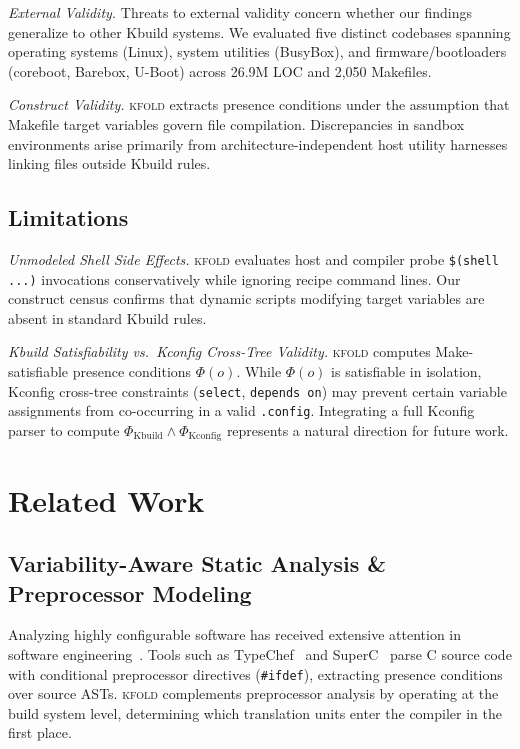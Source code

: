\documentclass[acmsmall,screen,review]{acmart}
\newcommand{\tool}{\textsc{kfold}\xspace}
\begin{document}
\emph{External Validity.} Threats to external validity concern whether our findings generalize to other Kbuild systems. We evaluated five distinct codebases spanning operating systems (Linux), system utilities (BusyBox), and firmware/bootloaders (coreboot, Barebox, U-Boot) across 26.9M LOC and 2,050 Makefiles.

\emph{Construct Validity.} \tool extracts presence conditions under the assumption that Makefile target variables govern file compilation. Discrepancies in sandbox environments arise primarily from architecture-independent host utility harnesses linking files outside Kbuild rules.

\subsection{Limitations}
\label{sec:threats:limitations}

\emph{Unmodeled Shell Side Effects.} \tool evaluates host and compiler probe \texttt{\$(shell ...)} invocations conservatively while ignoring recipe command lines. Our construct census confirms that dynamic scripts modifying target variables are absent in standard Kbuild rules.

\emph{Kbuild Satisfiability vs.\ Kconfig Cross-Tree Validity.} \tool computes Make-satisfiable presence conditions $\Phi(o)$. While $\Phi(o)$ is satisfiable in isolation, Kconfig cross-tree constraints (\texttt{select}, \texttt{depends on}) may prevent certain variable assignments from co-occurring in a valid \texttt{.config}. Integrating a full Kconfig parser to compute $\Phi_{\text{Kbuild}} \wedge \Phi_{\text{Kconfig}}$ represents a natural direction for future work.

\section{Related Work}
\label{sec:related}

\subsection{Variability-Aware Static Analysis \& Preprocessor Modeling}
Analyzing highly configurable software has received extensive attention in software engineering~\cite{berger2010variability,berger2013variability,dietrich2012variability,erwig2011choice,liebig2010analysis,tartler2011dead,ishimwe2021dynaplex,nadi2014where,passos2013coevolution,medeiros2016comparison}. Tools such as TypeChef~\cite{kenner2010typechef} and SuperC~\cite{gazzillo2012superc} parse C source code with conditional preprocessor directives (\texttt{\#ifdef}), extracting presence conditions over source ASTs. \tool complements preprocessor analysis by operating at the build system level, determining which translation units enter the compiler in the first place.
\end{document}
